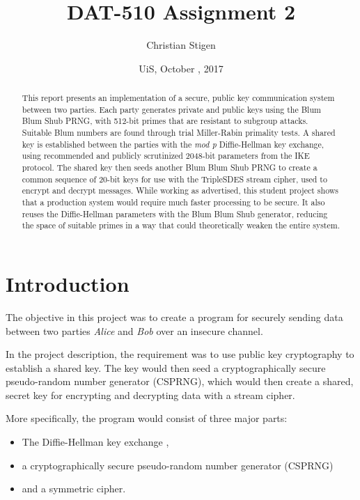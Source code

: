 \documentclass[a4paper,english,12pt]{article}
\title{DAT-510 Assignment 2}
\author{Christian Stigen}
\date{UiS, October \nth{9}, 2017}
\begin{document}
\maketitle

\begin{abstract}
  This report presents an implementation of a secure, public key communication
  system between two parties.
  Each party generates private and public keys using the Blum Blum Shub
  PRNG, with 512-bit primes that are resistant to subgroup attacks. Suitable
  Blum numbers are found through trial Miller-Rabin primality tests.
  A shared key is established between the parties with the \textit{mod p}
  Diffie-Hellman key exchange, using recommended and publicly scrutinized
  2048-bit parameters from the IKE protocol.
  The shared key then seeds another Blum Blum Shub PRNG to create a common
  sequence of 20-bit keys for use with the TripleSDES stream cipher, used to
  encrypt and decrypt messages.
  While working as advertised, this student project shows that a production
  system would require much faster processing to be secure. It also reuses the
  Diffie-Hellman parameters with the Blum Blum Shub generator, reducing the
  space of suitable primes in a way that could theoretically weaken the entire
  system.
\end{abstract}

\section{Introduction}
The objective in this project was to create a program for securely sending data
between two parties \textit{Alice} and \textit{Bob} over an insecure channel.

In the project description, the requirement was to use public key cryptography
to establish a shared key. The key would then seed a cryptographically secure
pseudo-random number generator (CSPRNG), which would then create a shared,
secret key for encrypting and decrypting data with a stream cipher.

More specifically, the program would consist of three major parts:
\begin{itemize}
  \item The Diffie-Hellman key exchange \cite{dh},
  \item a cryptographically secure pseudo-random number generator (CSPRNG)
  \item and a symmetric cipher.
\end{itemize}
\end{document}
